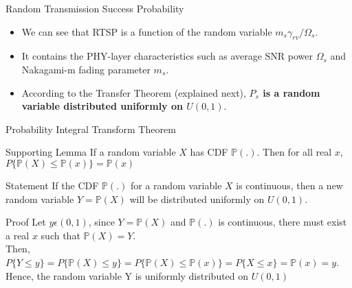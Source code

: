\documentclass{beamer}
\providecommand{\brak}[1]{\ensuremath{\left(#1\right)}}
\providecommand{\cbrak}[1]{\ensuremath{\{#1\}}}
\begin{document}
\begin{frame}{Random Transmission Success Probability}
    \begin{itemize}
        \item We can see that RTSP is a function of the random variable $m_{s}\gamma_{rv}/\Omega_{s}$.
        \item It contains the PHY-layer characteristics such as average SNR power $\Omega_{s}$ and Nakagami-m fading parameter $m_{s}$. 
        \item According to the Transfer Theorem (explained next), \textbf{$P_{s}$ is a random variable distributed uniformly on $U\brak{0,1}$}.
    \end{itemize}
\end{frame}
\begin{frame}{Probability Integral Transform Theorem}
\begin{block}{Supporting Lemma}
    If a random variable $X$ has CDF $\mathbb{P}\brak{.}$. Then for all real $x$, $P\cbrak{\mathbb{P}\brak{X}\leq{\mathbb{P}\brak{x}}}=\mathbb{P}\brak{x}$
\end{block}
    \begin{block}{Statement}
        If the CDF $\mathbb{P}\brak{.}$ for a random variable $X$ is continuous, then a new random variable $Y=\mathbb{P}\brak{X}$ will be distributed uniformly on $U\brak{0,1}$.
    \end{block}    
    \begin{block}{Proof}
        Let $y\epsilon\brak{0,1}$, since $Y=\mathbb{P}\brak{X}$ and $\mathbb{P}\brak{.}$ is continuous, there must exist a real $x$ such that $\mathbb{P}\brak{X}=Y$.\\
        Then, $P\cbrak{Y\leq{y}}=P\cbrak{\mathbb{P}\brak{X}\leq{y}}=P\cbrak{\mathbb{P}\brak{X}\leq{\mathbb{P}\brak{x}}}=P\cbrak{X\leq{x}}=\mathbb{P}\brak{x}=y$.\\
        Hence, the random variable Y is uniformly distributed on $U\brak{0,1}$
    \end{block}
\end{frame}
\end{document}
